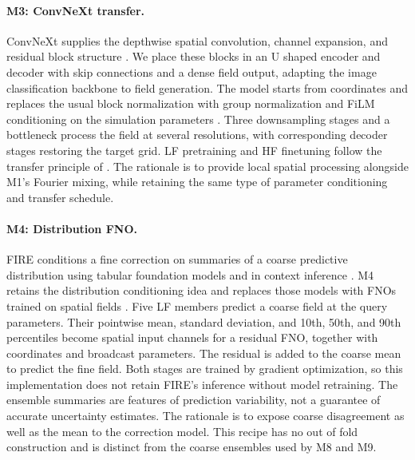 \paragraph{M3: ConvNeXt transfer.}
ConvNeXt supplies the depthwise spatial convolution, channel expansion, and
residual block structure \citep{liu2022convnext}. We place these blocks in an
U shaped encoder and decoder with skip connections \citep{ronneberger2015} and
a dense field output, adapting the image classification backbone to field
generation. The model starts from
coordinates and replaces the usual block normalization with group normalization
and FiLM conditioning on the simulation parameters \citep{perez2018}. Three
downsampling stages and a bottleneck process the field at several resolutions,
with corresponding decoder stages restoring the target grid. LF pretraining
and HF finetuning follow the transfer principle of \citet{lyu2023}. The
rationale is to provide local spatial processing alongside M1's Fourier mixing,
while retaining the same type of parameter conditioning and transfer schedule.

\paragraph{M4: Distribution FNO.}
FIRE conditions a fine correction on summaries of a coarse predictive
distribution using tabular foundation models and in context inference
\citep{yu2026fire}. M4 retains the distribution conditioning idea and replaces
those models with FNOs trained on spatial fields \citep{li2021fno}. Five LF
members predict a coarse field at the query parameters. Their pointwise mean,
standard deviation, and 10th, 50th, and 90th percentiles become spatial input
channels for a residual FNO, together with coordinates and broadcast parameters.
The residual is added to the coarse mean to predict the fine field. Both stages
are trained by gradient optimization, so this implementation does not retain
FIRE's inference without model retraining. The ensemble summaries are features
of prediction variability, not a guarantee of accurate uncertainty estimates. The
rationale is to expose coarse disagreement as well as the mean to the
correction model. This recipe has no out of fold construction and is distinct
from the coarse ensembles used by M8 and M9.

